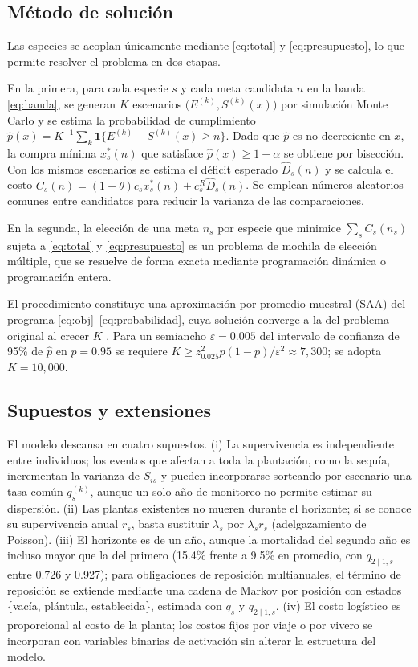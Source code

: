 \subsection{Método de solución}
\label{subsec:compra-solucion}

Las especies se acoplan únicamente mediante \eqref{eq:total} y \eqref{eq:presupuesto}, lo que permite resolver el problema en dos etapas.

En la primera, para cada especie $s$ y cada meta candidata $n$ en la banda \eqref{eq:banda}, se generan $K$ escenarios $\big(E^{(k)},S^{(k)}(x)\big)$ por simulación Monte Carlo \autocite{ross2013} y se estima la probabilidad de cumplimiento $\hat{p}(x)=K^{-1}\sum_k\mathbf{1}\{E^{(k)}+S^{(k)}(x)\geq n\}$. Dado que $\hat{p}$ es no decreciente en $x$, la compra mínima $x_s^{*}(n)$ que satisface $\hat{p}(x)\geq1-\alpha$ se obtiene por bisección. Con los mismos escenarios se estima el déficit esperado $\hat{D}_s(n)$ y se calcula el costo $C_s(n)=(1+\theta)c_sx_s^{*}(n)+c_s^R\hat{D}_s(n)$. Se emplean números aleatorios comunes entre candidatos para reducir la varianza de las comparaciones.

En la segunda, la elección de una meta $n_s$ por especie que minimice $\sum_sC_s(n_s)$ sujeta a \eqref{eq:total} y \eqref{eq:presupuesto} es un problema de mochila de elección múltiple, que se resuelve de forma exacta mediante programación dinámica o programación entera.

El procedimiento constituye una aproximación por promedio muestral (SAA) del programa \eqref{eq:obj}--\eqref{eq:probabilidad}, cuya solución converge a la del problema original al crecer $K$ \autocite{kleywegt2002,luedtke2008}. Para un semiancho $\varepsilon=0.005$ del intervalo de confianza de 95\% de $\hat{p}$ en $p=0.95$ se requiere $K\geq z_{0.025}^2p(1-p)/\varepsilon^2\approx7{,}300$; se adopta $K=10{,}000$.

\subsection{Supuestos y extensiones}
\label{subsec:compra-supuestos}

El modelo descansa en cuatro supuestos. (i) La supervivencia es independiente entre individuos; los eventos que afectan a toda la plantación, como la sequía, incrementan la varianza de $S_{is}$ y pueden incorporarse sorteando por escenario una tasa común $q_s^{(k)}$, aunque un solo año de monitoreo no permite estimar su dispersión. (ii) Las plantas existentes no mueren durante el horizonte; si se conoce su supervivencia anual $r_s$, basta sustituir $\lambda_s$ por $\lambda_sr_s$ (adelgazamiento de Poisson). (iii) El horizonte es de un año, aunque la mortalidad del segundo año es incluso mayor que la del primero (15.4\% frente a 9.5\% en promedio, con $q_{2\mid1,s}$ entre 0.726 y 0.927); para obligaciones de reposición multianuales, el término de reposición se extiende mediante una cadena de Markov por posición con estados \{vacía, plántula, establecida\}, estimada con $q_s$ y $q_{2\mid1,s}$. (iv) El costo logístico es proporcional al costo de la planta; los costos fijos por viaje o por vivero se incorporan con variables binarias de activación sin alterar la estructura del modelo.
